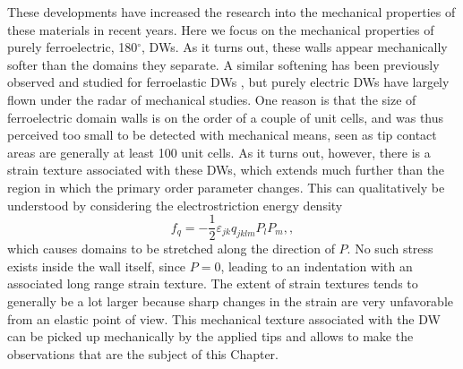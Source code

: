These developments have increased the research into the mechanical properties of these materials in recent years. Here we focus on the mechanical properties of purely ferroelectric, 180$^\circ$, DWs.
As it turns out, these walls appear mechanically softer than the domains they separate.
A similar softening has been previously observed and studied for ferroelastic DWs \cite{Lee2003}, but purely electric DWs have largely flown under the radar of mechanical studies.
One reason is that the size of ferroelectric domain walls is on the order of a couple of unit cells, and was thus perceived too small to be detected with mechanical means, seen as tip contact areas are generally at least 100 unit cells.
As it turns out, however, there is a strain texture associated with these DWs, which extends much further than the region in which the primary order parameter changes.
This can qualitatively be understood by considering the electrostriction energy density
\begin{equation}
f_{q}=-\frac{1}{2}\varepsilon_{jk}q_{jklm}P_{l}P_{m},\label{eq:qpp},
\end{equation}
which causes domains to be stretched along the direction of $P$.
No such stress exists inside the wall itself, since $P=0$, leading to an indentation with an associated long range strain texture.
The extent of strain textures tends to generally be a lot larger because sharp changes in the strain are very unfavorable from an elastic point of view.
This mechanical texture associated with the DW can be picked up mechanically by the applied tips and allows to make the observations that are the subject of this Chapter.


